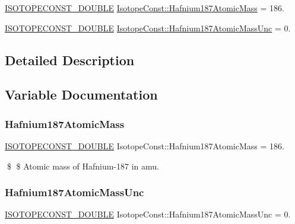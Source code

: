 \begin{DoxyCompactItemize}
\item 
\mbox{\hyperlink{group___isotope_const-_macros_ga8f45a7272ce02c0b4c65c44636ed719a}{I\+S\+O\+T\+O\+P\+E\+C\+O\+N\+S\+T\+\_\+\+D\+O\+U\+B\+LE}} \mbox{\hyperlink{group___isotope_const-_hafnium-_hf187_gad3038bf58b84253c4a9e631af54649dc}{Isotope\+Const\+::\+Hafnium187\+Atomic\+Mass}} = 186.
\item 
\mbox{\hyperlink{group___isotope_const-_macros_ga8f45a7272ce02c0b4c65c44636ed719a}{I\+S\+O\+T\+O\+P\+E\+C\+O\+N\+S\+T\+\_\+\+D\+O\+U\+B\+LE}} \mbox{\hyperlink{group___isotope_const-_hafnium-_hf187_gaa2536ac9d331c81652e092d97929d34f}{Isotope\+Const\+::\+Hafnium187\+Atomic\+Mass\+Unc}} = 0.
\end{DoxyCompactItemize}


\subsection{Detailed Description}


\subsection{Variable Documentation}
\mbox{\label{group___isotope_const-_hafnium-_hf187_gad3038bf58b84253c4a9e631af54649dc}} 
\subsubsection{\texorpdfstring{Hafnium187\+Atomic\+Mass}{Hafnium187AtomicMass}}
{\footnotesize\ttfamily \mbox{\hyperlink{group___isotope_const-_macros_ga8f45a7272ce02c0b4c65c44636ed719a}{I\+S\+O\+T\+O\+P\+E\+C\+O\+N\+S\+T\+\_\+\+D\+O\+U\+B\+LE}} Isotope\+Const\+::\+Hafnium187\+Atomic\+Mass = 186.}

\$ \$ Atomic mass of Hafnium-\/187 in amu. \mbox{\label{group___isotope_const-_hafnium-_hf187_gaa2536ac9d331c81652e092d97929d34f}} 
\subsubsection{\texorpdfstring{Hafnium187\+Atomic\+Mass\+Unc}{Hafnium187AtomicMassUnc}}
{\footnotesize\ttfamily \mbox{\hyperlink{group___isotope_const-_macros_ga8f45a7272ce02c0b4c65c44636ed719a}{I\+S\+O\+T\+O\+P\+E\+C\+O\+N\+S\+T\+\_\+\+D\+O\+U\+B\+LE}} Isotope\+Const\+::\+Hafnium187\+Atomic\+Mass\+Unc = 0.}

